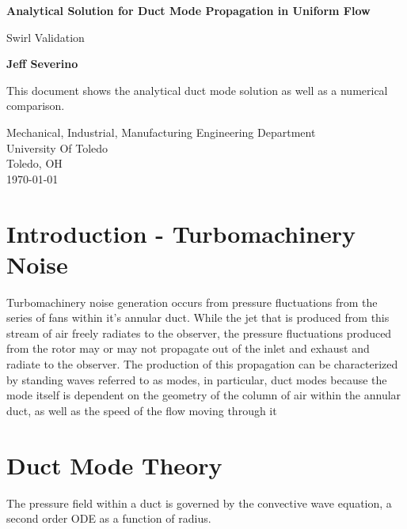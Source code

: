 \documentclass[a4paper]{report}
\begin{document}
\begin{titlepage}
    \begin{center}
        \vspace*{1cm}

        \textbf{Analytical Solution for Duct Mode Propagation in %
        Uniform Flow} 

        \vspace{0.5cm}
        Swirl Validation

        \vspace{1.5cm}

        \textbf{Jeff Severino}

        \vfill


        This document shows the analytical duct mode solution as well as a
        numerical comparison.
        \vspace{0.8cm}


        Mechanical, Industrial, Manufacturing Engineering Department\\
        University Of Toledo\\
        Toledo, OH\\
        \today

    \end{center}
\end{titlepage}
\section{Introduction - Turbomachinery Noise}
Turbomachinery noise generation occurs from pressure fluctuations from the series 
of fans within it's annular duct. While the jet that is produced from this stream
of air freely radiates to the observer, the pressure fluctuations 
produced from the rotor may or may not propagate out of the inlet and exhaust and 
radiate to the observer. The production of this propagation can be characterized
by standing waves referred to as modes, in particular, duct modes because 
the mode itself is dependent on the geometry of the column of air within the 
annular duct, as well as the speed of the flow moving through it
\newpage

\section{Duct Mode Theory}
The pressure field within a duct is governed by the convective wave equation, a
second order ODE as a function of radius. 
\end{document}
